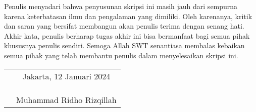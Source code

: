 Penulis menyadari bahwa penyusunan skripsi ini masih jauh dari sempurna
karena keterbatasan ilmu dan pengalaman yang dimiliki. Oleh karenanya, kritik
dan saran yang bersifat membangun akan penulis terima dengan senang hati. Akhir
kata, penulis berharap tugas akhir ini bisa bermanfaat bagi semua pihak
khususnya penulis sendiri. Semoga Allah SWT senantiasa membalas kebaikan semua
pihak yang telah membantu penulis dalam menyelesaikan skripsi ini.

\vspace{4cm}

\begin{tabular}{p{7.5cm}c}
	&Jakarta, 12 Januari 2024\\
	&\\
	&\\
	&\\
	&Muhammad Ridho Rizqillah
\end{tabular}
